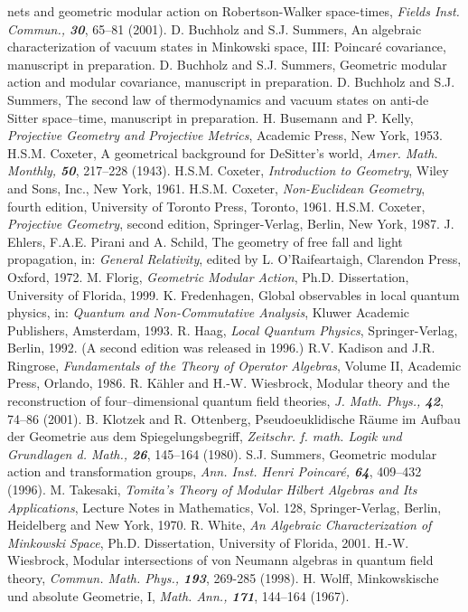 \documentclass[a4paper,twoside,12pt]{article}
\begin{document}
\begin{thebibliography}{Bor}
nets and geometric modular action on Robertson-Walker space-times, {\sl Fields 
Inst. Commun., \bf 30}, 65--81 (2001).
D. Buchholz and S.J. Summers, An algebraic 
characterization of vacuum states in Minkowski space, III: Poincar\'e
covariance, manuscript in preparation.
D. Buchholz and S.J. Summers, Geometric modular action and 
modular covariance, manuscript in preparation.
D. Buchholz and S.J. Summers, The second law of 
thermodynamics and vacuum states on anti-de Sitter space--time, manuscript
in preparation.
H. Busemann and P. Kelly, {\it Projective Geometry and 
Projective Metrics}, Academic Press, New York, 1953.
H.S.M. Coxeter, A geometrical background for DeSitter's
world, {\sl Amer. Math. Monthly, \bf 50}, 217--228 (1943).
H.S.M. Coxeter, {\it Introduction to Geometry}, Wiley and
Sons, Inc., New York, 1961.
H.S.M. Coxeter, {\it Non-Euclidean Geometry}, fourth edition, 
University of Toronto Press, Toronto, 1961.
H.S.M. Coxeter, {\it Projective Geometry}, second edition,
Springer-Verlag, Berlin, New York, 1987.
J. Ehlers, F.A.E. Pirani and A. Schild, The geometry of
free fall and light propagation, in: {\it General Relativity}, edited
by L. O'Raifeartaigh, Clarendon Press, Oxford, 1972.
M. Florig, {\it Geometric Modular Action}, Ph.D. Dissertation, 
University of Florida, 1999.
K. Fredenhagen, Global observables in local quantum physics, in:
{\it Quantum and Non-Commutative Analysis}, Kluwer Academic Publishers, 
Amsterdam, 1993. 
R. Haag, {\it Local Quantum Physics}, Springer-Verlag, Berlin,  
1992. (A second edition was released in 1996.)
R.V. Kadison and J.R. Ringrose, {\it Fundamentals of the 
Theory of Operator Algebras}, Volume II, Academic Press, Orlando, 1986.
R. K\"ahler and H.-W. Wiesbrock, Modular theory and the 
reconstruction of four--dimensional quantum field theories, {\sl J. Math. 
Phys., \bf 42}, 74--86 (2001).
B. Klotzek and R. Ottenberg, Pseudoeuklidische R\"aume im 
Aufbau der Geometrie aus dem Spiegelungsbegriff, {\sl Zeitschr. f. math. 
Logik und Grundlagen d. Math., \bf 26}, 145--164 (1980).
S.J. Summers, Geometric modular action and transformation groups,
{\sl Ann. Inst. Henri Poincar\'e, \bf 64}, 409--432 (1996).
M. Takesaki, {\it Tomita's Theory of Modular Hilbert Algebras and 
Its Applications}, Lecture Notes in Mathematics, Vol. 128, Springer-Verlag,
Berlin, Heidelberg and New York, 1970.                       
R. White, {\it An Algebraic Characterization of Minkowski Space}, 
Ph.D. Dissertation, University of Florida, 2001.
H.-W. Wiesbrock, Modular intersections of von Neumann algebras in
quantum field theory, {\sl Commun. Math. Phys., \bf 193}, 269-285 (1998).
H. Wolff, Minkowskische und absolute Geometrie, I, {\sl
Math. Ann., \bf 171}, 144--164 (1967).
\end{thebibliography}
\end{document}
